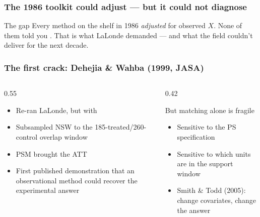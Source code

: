 \documentclass[10pt,aspectratio=169]{beamer}
\begin{document}
\begin{frame}
  \frametitle{The 1986 toolkit could adjust --- but it could not diagnose}
  \vspace{0.6cm}
  \begin{center}
    \quad\textperiodcentered\quad
    \quad\textperiodcentered\quad
  \end{center}
  \vspace{1.0em}
  \begin{block}{The gap}
    Every method on the shelf in 1986 \textit{adjusted} for observed $X$. None of them told you
    . That is what LaLonde demanded --- and what the
    field couldn't deliver for the next decade.
  \end{block}
\end{frame}

\begin{frame}
  \frametitle{The first crack: Dehejia \& Wahba (1999, JASA)}
  \vspace{0.3cm}
  \begin{columns}[T,onlytextwidth]
    \begin{column}{0.55\textwidth}
      \begin{itemize}
        \item Re-ran LaLonde, but with 
        \item Subsampled NSW to the 185-treated/260-control overlap window
        \item PSM brought the ATT 
        \item First published demonstration that an observational method could
        recover the experimental answer
      \end{itemize}
    \end{column}
    \begin{column}{0.42\textwidth}
      \begin{block}{But matching alone is fragile}
        \begin{itemize}\setlength{\itemsep}{0pt}
          \item Sensitive to the PS specification
          \item Sensitive to which units are in the support window
          \item Smith \& Todd (2005): change covariates, change the answer
        \end{itemize}
      \end{block}
    \end{column}
  \end{columns}
\end{frame}
\end{document}
